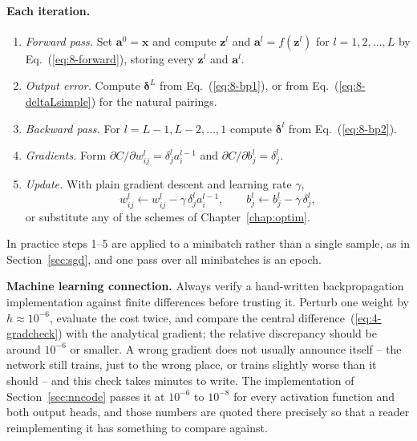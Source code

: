 \paragraph{Each iteration.}
\begin{enumerate}
  \item \emph{Forward pass.}  Set $\bm{a}^{0}=\bm{x}$ and compute
        $\bm{z}^{l}$ and $\bm{a}^{l}=f(\bm{z}^{l})$ for $l=1,2,\dots,L$ by
        Eq.~(\ref{eq:8-forward}), storing every $\bm{z}^{l}$ and $\bm{a}^{l}$.
  \item \emph{Output error.}  Compute $\bm{\delta}^{L}$ from
        Eq.~(\ref{eq:8-bp1}), or from Eq.~(\ref{eq:8-deltaLsimple}) for the
        natural pairings.
  \item \emph{Backward pass.}  For $l=L-1,L-2,\dots,1$ compute
        $\bm{\delta}^{l}$ from Eq.~(\ref{eq:8-bp2}).
  \item \emph{Gradients.}  Form
        $\partial C/\partial w_{ij}^{l}=\delta_j^{l}a_i^{l-1}$ and
        $\partial C/\partial b_j^{l}=\delta_j^{l}$.
  \item \emph{Update.}  With plain gradient descent and learning rate $\gamma$,
        \begin{equation}
          w_{ij}^{l}\leftarrow w_{ij}^{l}-\gamma\,\delta_j^{l}a_i^{l-1},
          \qquad
          b_j^{l}\leftarrow b_j^{l}-\gamma\,\delta_j^{l},
          \label{eq:8-update}
        \end{equation}
        or substitute any of the schemes of Chapter~\ref{chap:optim}.
\end{enumerate}
In practice steps 1--5 are applied to a minibatch rather than a single sample,
as in Section~\ref{sec:sgd}, and one pass over all minibatches is an epoch.

\begin{notebox}
\textbf{Machine learning connection.} 
Always verify a hand-written
backpropagation implementation against finite differences before trusting it.
Perturb one weight by $h\approx10^{-6}$, evaluate the cost twice, and compare
the central difference~(\ref{eq:4-gradcheck}) with the analytical gradient; the
relative discrepancy should be around $10^{-6}$ or smaller.  A wrong gradient
does not usually announce itself -- the network still trains, just to the wrong
place, or trains slightly worse than it should -- and this check takes minutes
to write.  The implementation of Section~\ref{sec:nncode} passes it at
$10^{-6}$ to $10^{-8}$ for every activation function and both output heads, and
those numbers are quoted there precisely so that a reader reimplementing it has
something to compare against.
\end{notebox}

